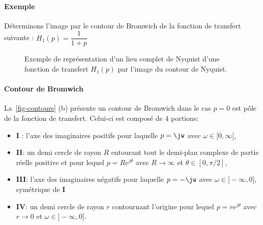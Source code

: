 \paragraph{Exemple}

Déterminons l'image par le contour de Bromwich de la fonction de transfert 
suivante : $H_1(p)=\dfrac{1}{1+p}$

\begin{figure}[!h]
    \centering
    
    \caption{Exemple de représentation d'un lieu complet de Nyquist d'une 
             fonction de transfert $H_1(p)$ par l'image du contour de 
             Nyquist. \label{fig-nyquist_complet_contour}}
\end{figure}

\paragraph{Contour de Bromwich}

La~\cref{fig-contours} (b) présente un contour de Bromwich dans le cas $p=0$ 
est pôle de la fonction de transfert. Celui-ci est composé de 4 portions:
\begin{itemize}
    \item \textbf{I} : l'axe des imaginaires positifs pour laquelle 
          $p=\jw$ avec $\omega\in[0,\infty[$,
    \item \textbf{II}: un demi cercle de rayon $R$ entourant tout le demi-plan 
          complexe de partie réelle positive 
          et pour lequel $p=Re^{j\theta}$ avec $R\rightarrow\infty$ et 
          $\theta\in[0,\pi/2]$,
    \item \textbf{III}: l'axe des imaginaires négatifs  pour laquelle $p=-\jw$ 
          avec $\omega\in]-\infty,0]$, symétrique de \textbf{I}
    \item \textbf{IV}:  un demi cercle de rayon $r$ contournant l'origine 
          pour lequel $p=re^{j\theta}$ avec $r\rightarrow0$ et 
          $\omega\in]-\infty,0]$.
\end{itemize}

